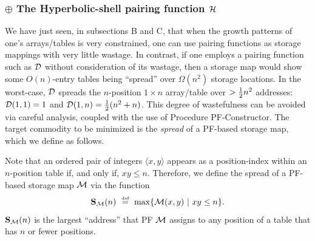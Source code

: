 \noindent {}

\subsubsection{$\oplus$ The Hyperbolic-shell pairing function $\mbox{$\cal H$}$}
\label{sec:hyp-shell-pair-fn}

We have just seen, in subsections B and C, that when the growth
patterns of one's arrays/tables is very constrained, one can use
pairing functions as storage mappings with very little wastage.  In
contrast, if one employs a pairing function such as $\mbox{$\cal D$}$ without
consideration of its wastage, then a storage map would show some
$O(n)$-entry tables being ``spread'' over $\Omega(n^2)$ storage
locations.  In the worst-case, $\mbox{$\cal D$}$ spreads the $n$-position $1 \times
n$ array/table over $> {1 \over 2} n^2$ addresses: $\mbox{$\cal D$}(1,1) = 1$ and
$\mbox{$\cal D$}(1,n) = {1 \over 2} (n^2 + n)$.  This degree of wastefulness can be
avoided via careful analysis, coupled with the use of Procedure
PF-Constructor.  The target commodity to be minimized is the {\it
  spread} of a PF-based storage map, which we define as follows.

Note that an ordered pair of integers $\langle x,y \rangle$ appears as
a position-index within an $n$-position table if, and only if, $xy
\leq n$.  Therefore, we define the spread of a PF-based storage map
$\mbox{$\cal M$}$ via the function
\begin{equation}
\label{e.compact}
{\bf S}_{\cal M}(n) \ \stackrel{\mbox{{\tiny def}}}{=} \ \max\{ \mbox{$\cal M$}(x, y) \ | \ xy \leq n \}.
\end{equation}
${\bf S}_{\cal M}(n)$ is the largest ``address'' that PF $\mbox{$\cal M$}$ assigns
to any position of a table that has $n$ or fewer positions.

